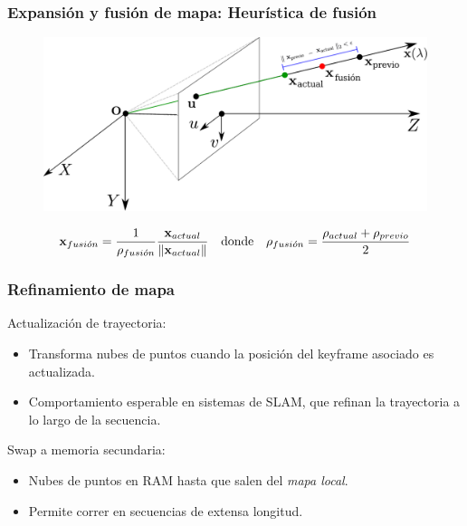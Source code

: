 \documentclass[compress]{beamer}
\begin{document}
\begin{frame}
	\frametitle{Expansión y fusión de mapa: Heurística de fusión}
	\begin{figure}[htb]
		\centering
		\includegraphics[width=\columnwidth]{method/metodo-fusion-spa.pdf}
	\end{figure}
	\begin{equation*}
		\boldsymbol{\mathbf{x}}_{fusi\acute{o}n}=\frac{1}{\rho_{fusi\acute{o}n}}\frac{\boldsymbol{\mathbf{x}}_{actual}}{\left\lVert\boldsymbol{\mathbf{x}}_{actual}\right\rVert}
		\quad \text{donde} \quad 
		\rho_{fusi\acute{o}n}=\frac{\rho_{actual}+\rho_{previo}}{2}
	\end{equation*}
\end{frame}


\begin{frame}
	\frametitle{Refinamiento de mapa}
	
	Actualización de trayectoria:
	\begin{itemize}
		\item Transforma nubes de puntos cuando la posición del keyframe asociado es actualizada.
		\item Comportamiento esperable en sistemas de SLAM, que refinan la trayectoria a lo largo de la secuencia.
	\end{itemize}

	\vspace{2em}
	\pause{}
	Swap a memoria secundaria:
	\begin{itemize}
		\item Nubes de puntos en RAM hasta que salen del \emph{mapa local}.
		\item Permite correr en secuencias de extensa longitud.
	\end{itemize}

\end{frame}
\end{document}

